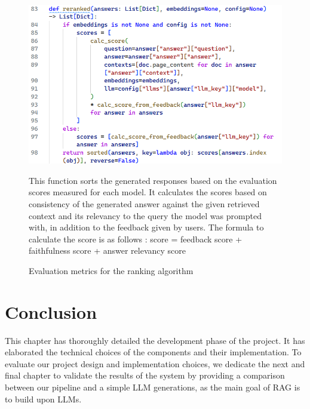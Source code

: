 \begin{figure}[H]
    \centering
    \includegraphics[width=\linewidth]{./figures/ranking-algo.png}
    \caption{Evaluation metrics for the ranking algorithm}
    \begin{flushleft}
        \small This function sorts the generated responses based on the evaluation scores measured for each model. It calculates the scores based on consistency of the generated answer against the given retrieved context and its relevancy to the query the model was prompted with, in addition to the feedback given by users. The formula to calculate the score is as follows :
        score = feedback score + faithfulness score + answer relevancy score
    \end{flushleft}
\end{figure}

\section{Conclusion}
This chapter has thoroughly detailed the development phase of the project. It has elaborated the technical choices of the components and their implementation.\newline
To evaluate our project design and implementation choices, we dedicate the next and final chapter to validate the results of the system by providing a comparison between our pipeline and a simple LLM generations, as the main goal of RAG is to build upon LLMs.